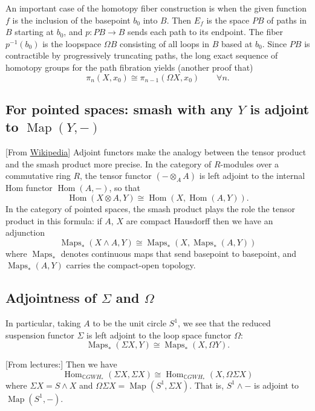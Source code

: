 \begin{defn}
	An important case of the homotopy fiber construction is when the given function $f$ is the inclusion of the basepoint $b_0$ into $B$. Then $E_{f}$ is the space $PB$ of paths in $B$ starting at $b_{0}$,  and $p:PB\to B$ sends each path to its endpoint. The fiber $p^{-1}(b_{0})$ is the loopspace $\Omega B$ consisting of all loops in  $B$ based at $b_{0}$. Since $PB$ is contractible by progressively truncating paths, the long exact sequence of homotopy groups for the path fibration yields (another proof that)
	\[\pi_{n}(X,x_{0})\cong \pi_{n-1}(\Omega X,x_{0})\qquad \forall n.\]
\end{defn}

\subsection{For pointed spaces: smash with any \texorpdfstring{$Y$}{Y}		 is adjoint to  \texorpdfstring{$\operatorname{Map}(Y,-)$}{Map(Y,-)}}
[From \href{https://en.wikipedia.org/wiki/Smash_product#}{Wikipedia}]
Adjoint functors make the analogy between the tensor product and the smash product more precise. In the category of $R$-modules over a commutative ring $R$, the tensor functor $(-\otimes_{A} A)$ is left adjoint to the internal Hom functor $\operatorname{Hom}(A,-)$, so that
\[\operatorname{Hom}(X\otimes A,Y)\cong \operatorname{Hom}(X,\operatorname{Hom}(A,Y)).\]
In the category of pointed spaces, the smash product plays the role the tensor product in this formula: if $A$, $X$ are compact Hausdorff then we have an adjunction
\[\operatorname{Maps}_{*}(X\wedge A,Y)\cong \operatorname{Maps}_{*}(X,\operatorname{Maps}_{*}(A,Y))\]
where $\operatorname{Maps}_{*}$ denotes continuous maps that send basepoint to basepoint, and $\operatorname{Maps}_{*}(A,Y)$ carries the compact-open topology.

\subsection{Adjointness of \texorpdfstring{$\Sigma$}{Σ} and \texorpdfstring{$\Omega$}{Ω}}
In particular, taking $A$ to be the unit circle $S^{1}$, we see that the reduced suspension functor $\Sigma$ is left adjoint to the loop space functor $\Omega$:
\[\operatorname{Maps}_{*}(\Sigma X,Y)\cong \operatorname{Maps}_{*}(X,\Omega Y).\]

[From lectures:] Then we have
\[\operatorname{Hom}_{\mathbb{C}GWH_*}(\Sigma X,\Sigma X)\cong\operatorname{Hom}_{\mathbb{C}GWH_*}(X,\Omega\Sigma X)\]
where $\Sigma X=S\wedge X$ and $\Omega\Sigma X=\operatorname{Map}(S^1,\Sigma X)$. That is, $S^1\wedge-$ is adjoint to $\operatorname{Map}(S^1,-)$.

